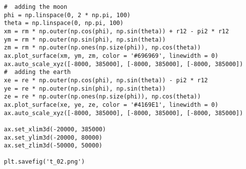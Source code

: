 \documentclass[12pt,fleqn]{article}\usepackage{../../common}
\begin{document}
\begin{verbatim}
#  adding the moon
phi = np.linspace(0, 2 * np.pi, 100)
theta = np.linspace(0, np.pi, 100)
xm = rm * np.outer(np.cos(phi), np.sin(theta)) + r12 - pi2 * r12
ym = rm * np.outer(np.sin(phi), np.sin(theta))
zm = rm * np.outer(np.ones(np.size(phi)), np.cos(theta))
ax.plot_surface(xm, ym, zm, color = '#696969', linewidth = 0)
ax.auto_scale_xyz([-8000, 385000], [-8000, 385000], [-8000, 385000])
#  adding the earth
xe = re * np.outer(np.cos(phi), np.sin(theta)) - pi2 * r12
ye = re * np.outer(np.sin(phi), np.sin(theta))
ze = re * np.outer(np.ones(np.size(phi)), np.cos(theta))
ax.plot_surface(xe, ye, ze, color = '#4169E1', linewidth = 0)
ax.auto_scale_xyz([-8000, 385000], [-8000, 385000], [-8000, 385000])

ax.set_xlim3d(-20000, 385000)
ax.set_ylim3d(-20000, 80000)
ax.set_zlim3d(-50000, 50000)

plt.savefig('t_02.png')
\end{verbatim}
\end{document}
